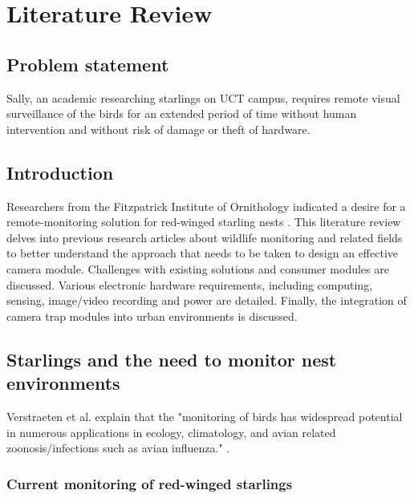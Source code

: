 \documentclass[class=report,11pt,crop=false]{standalone}
\begin{document}
\ifstandalone
\tableofcontents
\fi
\chapter{Literature Review \label{ch:literature}}

\section{Problem statement}

Sally, an academic researching starlings on UCT campus, requires remote visual surveillance of the birds for an extended period of time without human intervention and without risk of damage or theft of hardware.

\section{Introduction}

Researchers from the Fitzpatrick Institute of Ornithology indicated a desire for a remote-monitoring solution for red-winged starling nests \cite{hofmeyer2024private}. This literature review delves into previous research articles about wildlife monitoring and related fields to better understand the approach that needs to be taken to design an effective camera module. Challenges with existing solutions and consumer modules are discussed. Various electronic hardware requirements, including computing, sensing, image/video recording and power are detailed. Finally, the integration of camera trap modules into urban environments is discussed.

\section{Starlings and the need to monitor nest environments}

Verstraeten et al. explain that the "monitoring of birds has widespread potential in numerous applications in ecology, climatology, and avian related zoonosis/infections such as avian influenza." \cite{verstraeten2010webcams}.

\subsection{Current monitoring of red-winged starlings}
\end{document}
